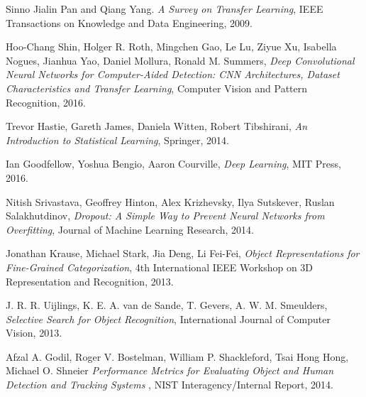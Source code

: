 \documentclass [11pt,letterpaper ,twoside ,openany ]{report}
\begin{document}
\begin{thebibliography}{9}
          Sinno Jialin Pan and Qiang Yang.
          \textit{A Survey on Transfer Learning},
          IEEE Transactions on Knowledge and Data Engineering,
          2009.                                                  

          Hoo-Chang Shin, Holger R. Roth, Mingchen Gao, Le Lu, Ziyue Xu, Isabella Nogues, Jianhua Yao, Daniel Mollura, Ronald M. Summers,
          \textit{Deep Convolutional Neural Networks for Computer-Aided Detection: CNN Architectures, Dataset Characteristics and Transfer Learning},
          Computer Vision and Pattern Recognition,
          2016.                              

          Trevor Hastie, Gareth James, Daniela Witten, Robert Tibshirani,
          \textit{An Introduction to Statistical Learning},
          Springer,
          2014.                                        

          Ian Goodfellow, Yoshua Bengio, Aaron Courville,
          \textit{Deep Learning},
          MIT Press,
          2016.                                        
           
          Nitish Srivastava, Geoffrey Hinton, Alex Krizhevsky, Ilya Sutskever, Ruslan Salakhutdinov,
          \textit{Dropout: A Simple Way to Prevent Neural Networks from Overfitting},
          Journal of Machine Learning Research,
          2014.                               

           Jonathan Krause, Michael Stark, Jia Deng, Li Fei-Fei,
          \textit{Object Representations for Fine-Grained Categorization},
          4th International IEEE Workshop on  3D Representation and Recognition,
          2013.                                         

           J. R. R. Uijlings, K. E. A. van de Sande, T. Gevers, A. W. M. Smeulders,
          \textit{Selective Search for Object Recognition},
          International Journal of Computer Vision,
          2013.                                                   

          Afzal A. Godil, Roger V. Bostelman, William P. Shackleford, Tsai Hong Hong, Michael O. Shneier 
          \textit{Performance Metrics for Evaluating Object and Human Detection and Tracking Systems },
          NIST Interagency/Internal Report,
          2014.                 


\end{thebibliography}
\end{document}
